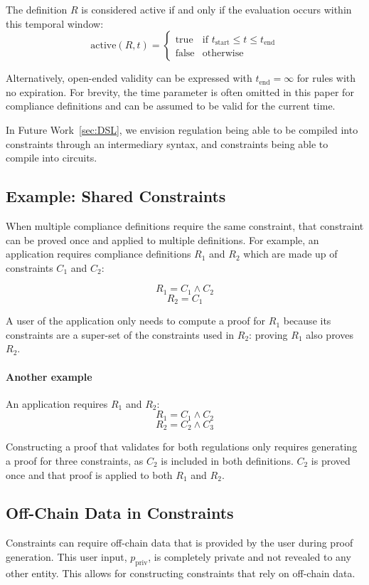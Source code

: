 \documentclass[9pt]{extreport}
\begin{document}
The definition $R$ is considered active if and only if the evaluation occurs within this temporal window:
$$\text{active}(R, t) = \begin{cases}
\text{true} & \text{if } t_{\text{start}} \leq t \leq t_{\text{end}} \\
\text{false} & \text{otherwise}
\end{cases}$$

Alternatively, open-ended validity can be expressed with $t_{\text{end}} = \infty$ for rules with no expiration.  For brevity, the time parameter is often omitted in this paper for compliance definitions and can be assumed to be valid for the current time.

In Future Work~\ref{sec:DSL}, we envision regulation being able to be compiled into constraints through an intermediary syntax, and constraints being able to compile into circuits.

\subsection{Example: Shared Constraints}
\label{sec:shared-constraints}
When multiple compliance definitions require the same constraint, that constraint can be proved once and applied to multiple definitions.  For example, an application requires compliance definitions $R_1$ and $R_2$ which are made up of constraints $C_1$ and $C_2$:

$$R_1 = C_1 \land C_2$$
$$R_2 = C_1$$

A user of the application only needs to compute a proof for $R_1$ because its constraints are a super-set of the constraints used in $R_2$: proving $R_1$ also proves $R_2$.

\paragraph{Another example}
An application requires $R_1$ and $R_2$:
$$R_1 = C_1 \land C_2$$
$$R_2 = C_2 \land C_3$$

Constructing a proof that validates for both regulations only requires generating a proof for three constraints, as $C_2$ is included in both definitions.  $C_2$ is proved once and that proof is applied to both $R_1$ and $R_2$.


\subsection{Off-Chain Data in Constraints}
Constraints can require off-chain data that is provided by the user during proof generation.  This user input, $p_{\text{priv}}$, is completely private and not revealed to any other entity.  This allows for constructing constraints that rely on off-chain data.
\end{document}
